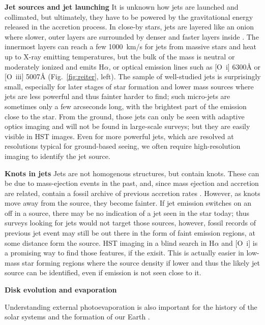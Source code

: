 \documentclass[12pt]{article}
\begin{document}
\textbf{Jet sources and jet launching}
It is unknown how jets are launched and collimated, but ultimately, they have to be powered by the gravitational energy released in the accretion process. In close-by stars, jets are layered like an onion where slower, outer layers are surrounded by denser and faster layers inside \citep{2000ApJ...537L..49B}. The innermost layers can reach a few 1000~km/s for jets from massive stars and heat up to X-ray emitting temperatures, but the bulk of the mass is neutral or moderately ionized and emits H$\alpha$, or optical emission lines such as [O~{\sc i}] 6300\AA{} or [O~{\sc iii}] 5007\AA{} (Fig.~\ref{fig:reiter}, left). The sample of well-studied jets is surprisingly small, especially for later stages of star formation and lower mass sources where jets are less powerful and thus fainter harder to find; such micro-jets are sometimes only a few arcseconds long, with the brightest part of the emission close to the star. From the ground, those jets can only be seen with adaptive optics imaging and will not be found in large-scale surveys; but they are easily visible in HST images. Even for more powerful jets, which are resolved at resolutions typical for ground-based seeing, we often require high-resolution imaging to identify the jet source.

\textbf{Knots in jets}
Jets are not homogenous structures, but contain knots. These can be due to mass-ejection events in the past, and, since mass ejection and accretion are related, contain a fossil archive of previous accretion rates \citep{2014A&A...563A..87E}. However, as knots move away from the source, they become fainter. If jet emission switches on an off in a source, there may be no indication of a jet seen in the star today; thus surveys looking for jets would not target those sources, however, fossil records of previous jet event may still be out there in the form of faint emission regions, at some distance form the source. HST imaging in a blind search in H$\alpha$ and [O~{\sc i}] is a promising way to find those features, if the exisit. This is actually easier in low-mass star forming regions where the source density if lower and thus the likely jet source can be identified, even if emission is not seen close to it.

\textbf{Disk evolution and evaporation}

Understanding external photoevaporation is also important for the history of the solar systems and the formation of our Earth \citep{2015ApJ...815..112K}.
\end{document}
